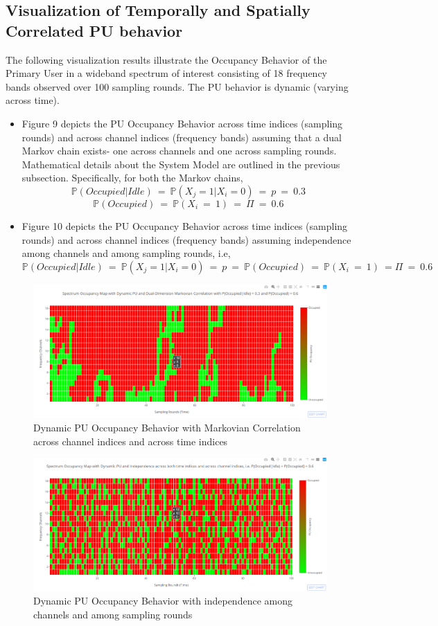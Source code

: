 \documentclass[12pt, draftcls, onecolumn]{IEEEtran}
\begin{document}
\subsection{Visualization of Temporally and Spatially Correlated PU behavior}
The following visualization results illustrate the Occupancy Behavior of the Primary User in a wideband spectrum of interest consisting of 18 frequency bands observed over 100 sampling rounds. The PU behavior is dynamic (varying across time).
\begin{itemize}
    \item Figure 9 depicts the PU Occupancy Behavior across time indices (sampling rounds) and across channel indices (frequency bands) assuming that a dual Markov chain exists- one across channels and one across sampling rounds. Mathematical details about the System Model are outlined in the previous subsection. Specifically, for both the Markov chains, 
    \[\mathbb P(Occupied|Idle)\ =\ \mathbb P(X_j = 1|X_i = 0)\ =\ p\ =\ 0.3\]
    \[\mathbb P(Occupied)\ =\ \mathbb P(X_i\ =\ 1)\ =\ \Pi\ =\ 0.6\]
    \item Figure 10 depicts the PU Occupancy Behavior across time indices (sampling rounds) and across channel indices (frequency bands) assuming independence among channels and among sampling rounds, i.e,
    \[\mathbb P(Occupied|Idle)\ =\ \mathbb P(X_j = 1|X_i = 0)\ =\ p\ =\ \mathbb P(Occupied)\ =\ \mathbb P(X_i\ =\ 1)\ = \Pi\ =\ 0.6\]
\end{itemize}
\begin{figure}[t]
\includegraphics[width=1.0\textwidth]{Spectrum_Occupancy_SpatioTemporal_Markovian_Correlation.png}
\caption{Dynamic PU Occupancy Behavior with Markovian Correlation across channel indices and across time indices}
\label{fig:mesh9}
\centering
\end{figure}
\begin{figure}[t]
\includegraphics[width=1.0\textwidth]{Spectrum_Occupancy_SpatioTemporal_Independence_2.png}
\caption{Dynamic PU Occupancy Behavior with independence among channels and among sampling rounds}
\label{fig:mesh10}
\centering
\end{figure}
\end{document}
